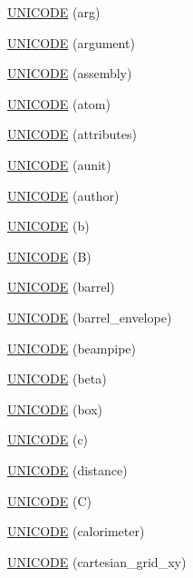 \begin{DoxyCompactItemize}
\hyperlink{namespace_d_d4hep_1_1_x_m_l_a6f421944f5831041665db88a3467346b}{UNICODE} (arg)
\item 
\hyperlink{namespace_d_d4hep_1_1_x_m_l_a7ba6f4de324ae3be375b6907dd98c39b}{UNICODE} (argument)
\item 
\hyperlink{namespace_d_d4hep_1_1_x_m_l_a53fbcd748017c633abcaf6e180273bc1}{UNICODE} (assembly)
\item 
\hyperlink{namespace_d_d4hep_1_1_x_m_l_a6f10960f07e1382c095559abc0b23536}{UNICODE} (atom)
\item 
\hyperlink{namespace_d_d4hep_1_1_x_m_l_a258e796f1da5ee1741cb66066d5af397}{UNICODE} (attributes)
\item 
\hyperlink{namespace_d_d4hep_1_1_x_m_l_ae87b8e24ce2906599d9abc5418339bde}{UNICODE} (aunit)
\item 
\hyperlink{namespace_d_d4hep_1_1_x_m_l_a68cef4944649864adb3a897b82b74f46}{UNICODE} (author)
\item 
\hyperlink{namespace_d_d4hep_1_1_x_m_l_a91cdbd4403903a23fc89a3c6f8fbbc1c}{UNICODE} (b)
\item 
\hyperlink{namespace_d_d4hep_1_1_x_m_l_aa38b6117dd6cfb7f18a1d8edb53802f9}{UNICODE} (B)
\item 
\hyperlink{namespace_d_d4hep_1_1_x_m_l_acecfc39b8bd7d1ad3f913460455b8c3d}{UNICODE} (barrel)
\item 
\hyperlink{namespace_d_d4hep_1_1_x_m_l_a8a731a0f9270783f7ccc1824c93b53c9}{UNICODE} (barrel\_\-envelope)
\item 
\hyperlink{namespace_d_d4hep_1_1_x_m_l_a3ccbaea264dfe97079c7eca35c629545}{UNICODE} (beampipe)
\item 
\hyperlink{namespace_d_d4hep_1_1_x_m_l_a956ac5a230a79cf5d08be76044e9cf25}{UNICODE} (beta)
\item 
\hyperlink{namespace_d_d4hep_1_1_x_m_l_ab65cacab7fd28b830a5beafdf652c0f0}{UNICODE} (box)
\item 
\hyperlink{namespace_d_d4hep_1_1_x_m_l_a2710c9726bb1726142666d83be6dd910}{UNICODE} (c)
\item 
\hyperlink{namespace_d_d4hep_1_1_x_m_l_a7706bd91846ffc9a84cff5e218e2f75b}{UNICODE} (distance)
\item 
\hyperlink{namespace_d_d4hep_1_1_x_m_l_a15ba95eb2e202f6dac2762ab37e96b27}{UNICODE} (C)
\item 
\hyperlink{namespace_d_d4hep_1_1_x_m_l_a0e714fb97b896c24e059b7814d1dde51}{UNICODE} (calorimeter)
\item 
\hyperlink{namespace_d_d4hep_1_1_x_m_l_a2ec5a989120161c52e0659d9b4e7d9e8}{UNICODE} (cartesian\_\-grid\_\-xy)

\end{DoxyCompactItemize}
